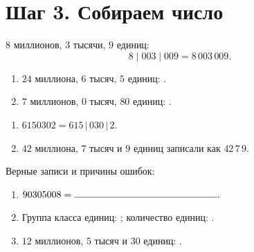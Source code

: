 \newpage
\section{Шаг 3. Собираем число}

\begin{problembox}[Образец]
  \(8\) миллионов, \(3\) тысячи, \(9\) единиц:
  \[
    8\;|\;003\;|\;009=8\,003\,009.
  \]
\end{problembox}

\begin{practicebox}
  \begin{enumerate}[label=\textbf{\arabic*.}]
    \item \(24\) миллиона, \(6\) тысяч, \(5\) единиц:
      \answerblank[55mm].
    \item \(7\) миллионов, \(0\) тысяч, \(80\) единиц:
      \answerblank[55mm].
  \end{enumerate}
\end{practicebox}

\begin{warningbox}
  \begin{enumerate}[label=\textbf{\arabic*.}]
    \item \(6150302=615\,|\,030\,|\,2\).
    \item \(42\) миллиона, \(7\) тысяч и \(9\) единиц записали как
      \(42\,7\,9\).
  \end{enumerate}
  Верные записи и причины ошибок:
\end{warningbox}

\begin{checkpointbox}
  \begin{enumerate}[label=\textbf{\arabic*.}]
    \item \(90305008=\answerblank[52mm].\)
    \item Группа класса единиц: \answerblank[16mm]; количество единиц:
      \answerblank[16mm].
    \item \(12\) миллионов, \(5\) тысяч и \(30\) единиц:
      \answerblank[45mm].
  \end{enumerate}
\end{checkpointbox}
